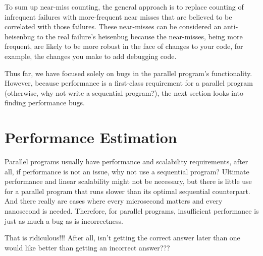 To sum up near-miss counting, the general approach is to replace counting
of infrequent failures with more-frequent near misses that are believed
to be correlated with those failures.
These near-misses can be considered an anti-heisenbug to the real failure's
heisenbug because the near-misses, being more frequent, are likely to
be more robust in the face of changes to your code, for example, the
changes you make to add debugging code.

Thus far, we have focused solely on bugs in the parallel program's
functionality.
However, because performance is a first-class requirement for a
parallel program (otherwise, why not write a sequential program?),
the next section looks into finding performance bugs.

\section{Performance Estimation}
\label{sec:debugging:Performance Estimation}

Parallel programs usually have performance and scalability requirements,
after all, if performance is not an issue, why not use a sequential
program?
Ultimate performance and linear scalability might not be necessary, but
there is little use for a parallel program that runs slower than its
optimal sequential counterpart.
And there really are cases where every microsecond matters and every
nanosecond is needed.
Therefore, for parallel programs, insufficient performance is just as
much a bug as is incorrectness.

\QuickQuiz{}
	That is ridiculous!!!
	After all, isn't getting the correct answer later than one would like
	better than getting an incorrect answer???
 \QuickQuizEnd

